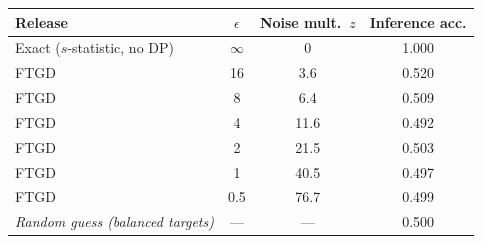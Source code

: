 \begin{tabular}{lccc}
\toprule
Release & $\epsilon$ & Noise mult.\ $z$ & Inference acc. \\
\midrule
Exact ($s$-statistic, no DP) & $\infty$ & 0 & 1.000 \\
FTGD & 16 & 3.6 & 0.520 \\
FTGD & 8 & 6.4 & 0.509 \\
FTGD & 4 & 11.6 & 0.492 \\
FTGD & 2 & 21.5 & 0.503 \\
FTGD & 1 & 40.5 & 0.497 \\
FTGD & 0.5 & 76.7 & 0.499 \\
\midrule
\emph{Random guess (balanced targets)} & --- & --- & 0.500 \\
\bottomrule
\end{tabular}